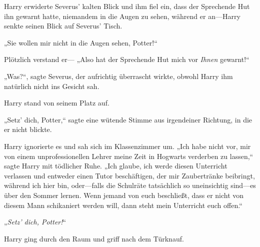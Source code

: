 Harry erwiderte Severus’ kalten Blick und ihm fiel ein, dass der Sprechende Hut ihn gewarnt hatte, niemandem in die Augen zu sehen, während er an—Harry senkte seinen Blick auf Severus’ Tisch.

„Sie wollen mir nicht in die Augen sehen, Potter!“

Plötzlich verstand er— „Also hat der Sprechende Hut mich vor \emph{Ihnen} gewarnt!“

„Was?“, sagte Severus, der aufrichtig überrascht wirkte, obwohl Harry ihm natürlich nicht ins Gesicht sah.

Harry stand von seinem Platz auf.

„Setz’ dich, Potter,“ sagte eine wütende Stimme aus irgendeiner Richtung, in die er nicht blickte.

Harry ignorierte es und sah sich im Klassenzimmer um. „Ich habe nicht vor, mir von einem unprofessionellen Lehrer meine Zeit in Hogwarts verderben zu lassen,“ sagte Harry mit tödlicher Ruhe. „Ich glaube, ich werde diesen Unterricht verlassen und entweder einen Tutor beschäftigen, der mir Zaubertränke beibringt, während ich hier bin, oder—falls die Schulräte tatsächlich so uneinsichtig sind—es über den Sommer lernen. Wenn jemand von euch beschließt, dass er nicht von diesem Mann schikaniert werden will, dann steht mein Unterricht euch offen.“

„\emph{Setz’ dich, Potter!}“

Harry ging durch den Raum und griff nach dem Türknauf.

